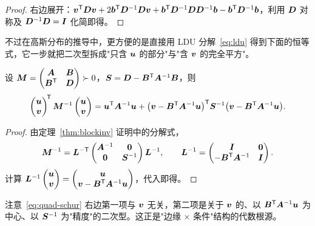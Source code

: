 \begin{proof}
右边展开：$\bm{v}^{\mathsf{T}}\bm{D}\bm{v}+2\bm{b}^{\mathsf{T}}\bm{D}^{-1}\bm{D}\bm{v}+\bm{b}^{\mathsf{T}}\bm{D}^{-1}\bm{D}\bm{D}^{-1}\bm{b}-\bm{b}^{\mathsf{T}}\bm{D}^{-1}\bm{b}$，利用 $\bm{D}$ 对称及 $\bm{D}^{-1}\bm{D}=\bm{I}$ 化简即得。
\end{proof}

不过在高斯分布的推导中，更方便的是直接用 LDU 分解~\eqref{eq:ldu} 得到下面的恒等式，它一步就把二次型拆成"只含 $\bm{u}$ 的部分"与"含 $\bm{v}$ 的完全平方"。

\begin{proposition}\label{prop:quad-schur}
设 $\bm{M}=\begin{pmatrix}\bm{A}&\bm{B}\\ \bm{B}^{\mathsf{T}}&\bm{D}\end{pmatrix}\succ 0$，$\bm{S}=\bm{D}-\bm{B}^{\mathsf{T}}\bm{A}^{-1}\bm{B}$，则
\begin{equation}\label{eq:quad-schur}
\begin{pmatrix}\bm{u}\\ \bm{v}\end{pmatrix}^{\!\mathsf{T}}\bm{M}^{-1}\begin{pmatrix}\bm{u}\\ \bm{v}\end{pmatrix}
=\bm{u}^{\mathsf{T}}\bm{A}^{-1}\bm{u}+\big(\bm{v}-\bm{B}^{\mathsf{T}}\bm{A}^{-1}\bm{u}\big)^{\mathsf{T}}\bm{S}^{-1}\big(\bm{v}-\bm{B}^{\mathsf{T}}\bm{A}^{-1}\bm{u}\big).
\end{equation}
\end{proposition}

\begin{proof}
由定理~\ref{thm:blockinv} 证明中的分解式，
\[
\bm{M}^{-1}=\bm{L}^{-\mathsf{T}}\begin{pmatrix}\bm{A}^{-1}&\bm{0}\\ \bm{0}&\bm{S}^{-1}\end{pmatrix}\bm{L}^{-1},\qquad
\bm{L}^{-1}=\begin{pmatrix}\bm{I}&\bm{0}\\ -\bm{B}^{\mathsf{T}}\bm{A}^{-1}&\bm{I}\end{pmatrix}.
\]
计算 $\bm{L}^{-1}\begin{pmatrix}\bm{u}\\ \bm{v}\end{pmatrix}=\begin{pmatrix}\bm{u}\\ \bm{v}-\bm{B}^{\mathsf{T}}\bm{A}^{-1}\bm{u}\end{pmatrix}$，代入即得。
\end{proof}

注意~\eqref{eq:quad-schur} 右边第一项与 $\bm{v}$ 无关，第二项是关于 $\bm{v}$ 的、以 $\bm{B}^{\mathsf{T}}\bm{A}^{-1}\bm{u}$ 为中心、以 $\bm{S}^{-1}$ 为"精度"的二次型。这正是"边缘 $\times$ 条件"结构的代数根源。

